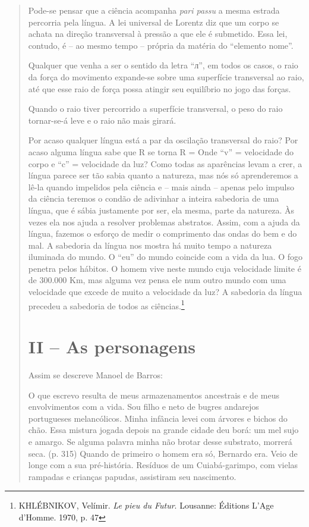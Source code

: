 \begin{quote}
Pode-se pensar que a ciência acompanha \emph{pari passu} a mesma estrada
percorria pela língua. A lei universal de Lorentz diz que um corpo se
achata na direção transversal à pressão a que ele é submetido. Essa lei,
contudo, é -- ao mesmo tempo -- própria da matéria do ``elemento nome''.

Qualquer que venha a ser o sentido da letra ``л'', em todos os casos, o
raio da força do movimento expande-se sobre uma superfície transversal
ao raio, até que esse raio de força possa atingir seu equilíbrio no jogo
das forças.

Quando o raio tiver percorrido a superfície transversal, o peso do raio
tornar-se-á leve e o raio não mais girará.

Por acaso qualquer língua está a par da oscilação transversal do raio?
Por acaso alguma língua sabe que R se torna R =
Onde ``v'' =
velocidade do corpo e ``c'' = velocidade da luz? Como todas as
aparências levam a crer, a língua parece ser tão sabia quanto a
natureza, mas nós só aprenderemos a lê-la quando impelidos pela ciência
e -- mais ainda -- apenas pelo impulso da ciência teremos o condão de
adivinhar a inteira sabedoria de uma língua, que é sábia justamente por
ser, ela mesma, parte da natureza. Às vezes ela nos ajuda a resolver
problemas abstratos. Assim, com a ajuda da língua, fazemos o esforço de
medir o comprimento das ondas do bem e do mal. A sabedoria da língua nos
mostra há muito tempo a natureza iluminada do mundo. O ``eu'' do mundo
coincide com a vida da lua. O fogo penetra pelos hábitos. O homem vive
neste mundo cuja velocidade limite é de 300.000 Km, mas alguma vez pensa
ele num outro mundo com uma velocidade que excede de muito a velocidade
da luz? A sabedoria da língua precedeu a sabedoria de todos as
ciências.\footnote{KHLÉBNIKOV, Velímir. \emph{Le pieu du Futur}.
  Lousanne: Éditions L'Age d'Homme. 1970, p. 47}

\section{II -- As personagens}

Assim se descreve Manoel de Barros:

O que escrevo resulta de meus armazenamentos ancestrais e de meus
envolvimentos com a vida. Sou filho e neto de bugres andarejos
portugueses melancólicos. Minha infância levei com árvores e bichos do
chão. Essa mistura jogada depois na grande cidade deu borá: um mel sujo
e amargo. Se alguma palavra minha não brotar desse substrato, morrerá
seca. (p. 315) Quando de primeiro o homem era só, Bernardo era. Veio de
longe com a sua pré-história. Resíduos de um Cuiabá-garimpo, com vielas
rampadas e crianças papudas, assistiram seu nascimento.


\end{quote}
